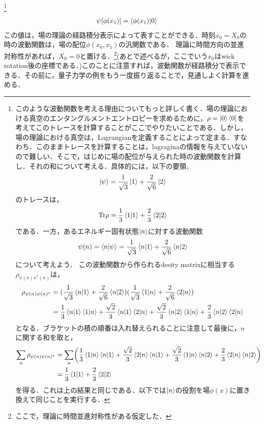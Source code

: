 \footnote{このような波動関数を考える理由についてもっと詳しく書く．場の理論における真空のエンタングルメントエントロピーを求めるために，$\rho=\ket{0}\bra{0}$を考えてこのトレースを計算することがここでやりたいことである．しかし，場の理論における真空は，Lagrangianを定義することによって定まる．すなわち．このままトレースを計算することは，lagraginaの情報を与えていないので難しい．そこで，はじめに場の配位が与えられた時の波動関数を計算し．それの和について考える．具体的には，以下の要領．
\begin{align}
  \ket{\psi}=\frac{1}{\sqrt{3}}\ket{1}+\frac{2}{\sqrt{6}}\ket{2}
\end{align}
のトレースは，
\begin{align}
  \mathrm{Tr}\rho=\frac{1}{3}\braket{1|1}+\frac{2}{3}\braket{2|2}
\end{align}
である．一方，あるエネルギー固有状態$\ket{n}$に対する波動関数
\begin{align}
  \psi(n)=\braket{n|\psi}=\frac{1}{\sqrt{3}}\braket{n|1}+\frac{2}{\sqrt{6}}\braket{n|2}
\end{align}について考えよう．
この波動関数から作られるdesity matrixに相当する$\rho_{\psi(n)\psi^{*}(n)}$は，
\begin{align}
  \rho_{\psi(n)\psi(n)^{*}}&=(\frac{1}{\sqrt{3}}\braket{n|1}+\frac{2}{\sqrt{6}}\braket{n|2})(\frac{1}{\sqrt{3}}\braket{1|n}+\frac{2}{\sqrt{6}}\braket{2|n})\\
  &=\frac{1}{3}\braket{n|1}\braket{1|n}+\frac{\sqrt{2}}{3}\braket{n|1}\braket{2|n}
  +\frac{\sqrt{2}}{3}\braket{n|2}\braket{1|n}+\frac{2}{3}\braket{n|2}\braket{2|n}
\end{align}となる．ブラケットの積の順番は入れ替えられることに注意して最後に，$n$に関する和を取と，
\begin{align}
  \sum_{n}\rho_{\psi(n)\psi(n)^{*}}&=  \sum_{n}\biggl(\frac{1}{3}\braket{1|n}\braket{n|1}+\frac{\sqrt{2}}{3}\braket{2|n}\braket{n|1}
  +\frac{\sqrt{2}}{3}\braket{1|n}\braket{n|2}+\frac{2}{3}\braket{2|n}\braket{n|2}\biggr)\\
  &=\frac{1}{3}\braket{1|1}+\frac{2}{3}\braket{2|2}
\end{align}
を得る．これは上の結果と同じである．以下では$\ket{n}$の役割を場$\phi(x)$に置き換えて同じことを実行する．}
\begin{align}
  \psi[\phi(x_{1})]=\braket{\phi(x_1)|0}
\end{align}
この値は，場の理論の経路積分表示によって表すことができる．時刻$x_0=X_0$の時の波動関数は，場の配位$\phi(x_0,x_1)$の汎関数である．
理論に時間方向の並進対称性があれば，$X_0=0$と置ける．\footnote{ここで，理論に時間並進対称性がある仮定した．}(あとで述べるが，ここでいう$x_0$はwick rotation後の座標である．)このことに注意すれば，波動関数が経路積分で表示できる．その前に，量子力学の例をもう一度振り返ることで，見通しよく計算を進める．

